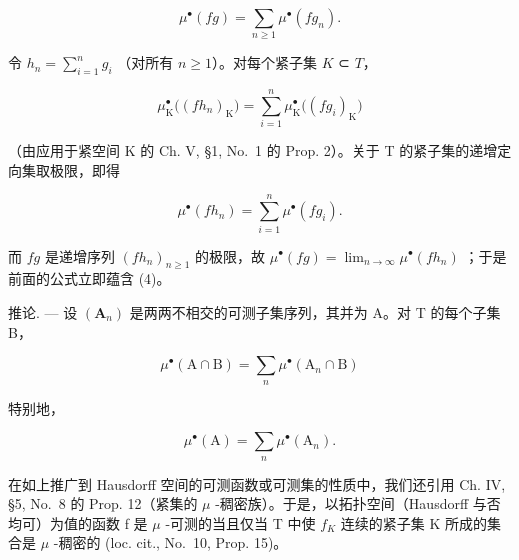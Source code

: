 \[
\mu^ {\bullet} (f g) = \sum_ {n \geqslant 1} \mu^ {\bullet} (f g _ {n}).\tag{4}
\]

令 \(h_n = \sum_{i=1}^{n} g_i\) （对所有 \(n \geqslant 1\)）。对每个紧子集 \(K\) ⊂ \(T\)，

\[
\mu_ {\mathrm{K}} ^ {\bullet} \big ((f h _ {n}) _ {\mathrm{K}} \big) = \sum_ {i = 1} ^ {n} \mu_ {\mathrm{K}} ^ {\bullet} \big ((f g _ {i}) _ {\mathrm{K}} \big)
\]

（由应用于紧空间 K 的 Ch. V, §1, No.~1 的 Prop. 2）。关于 T 的紧子集的递增定向集取极限，即得

\[
\mu^ {\bullet} (f h _ {n}) = \sum_ {i = 1} ^ {n} \mu^ {\bullet} (f g _ {i}).
\]

而 \(fg\) 是递增序列 \((fh_n)_{n\geqslant 1}\) 的极限，故 \(\mu^{\bullet}(fg) = \lim_{n\to \infty}\mu^{\bullet}(fh_n)\) ；于是前面的公式立即蕴含 (4)。

推论. --- 设 \((\mathbf{A}_{n})\) 是两两不相交的可测子集序列，其并为 A。对 T 的每个子集 B，

\[
\mu^ {\bullet} (\mathrm{A} \cap \mathrm{B}) = \sum_ {n} \mu^ {\bullet} (\mathrm{A} _ {n} \cap \mathrm{B})
\]

特别地，

\[
\mu^ {\bullet} (\mathrm{A}) = \sum_ {n} \mu^ {\bullet} (\mathrm{A} _ {n}).
\]

在如上推广到 Hausdorff 空间的可测函数或可测集的性质中，我们还引用 Ch. IV, §5, No.~8 的 Prop. 12（紧集的 \(\mu\) -稠密族）。于是，以拓扑空间（Hausdorff 与否均可）为值的函数 f 是 \(\mu\) -可测的当且仅当 T 中使 \(f_{K}\) 连续的紧子集 K 所成的集合是 \(\mu\) -稠密的 (loc. cit., No.~10, Prop. 15)。

